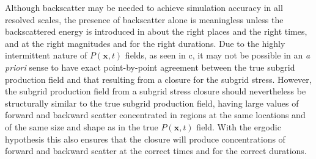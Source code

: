 Although backscatter may be needed to achieve simulation accuracy in all resolved scales, the presence of backscatter alone is meaningless unless the backscattered energy is introduced in about the right places and the right times, and at the right magnitudes and for the right durations. Due to the highly intermittent nature of  $P(\mathbf{x},t)$  fields, as seen in c, it may not be possible in an \textit{a priori} sense to have exact point-by-point agreement between the true subgrid production field and that resulting from a closure for the subgrid stress. However, the subgrid production field from a subgrid stress closure should nevertheless be structurally similar to the true subgrid production field, having large values of forward and backward scatter concentrated in regions at the same locations and of the same size and shape as in the true  $P(\mathbf{x},t)$  field. With the ergodic hypothesis this also ensures that the closure will produce concentrations of forward and backward scatter at the correct times and for the correct durations.

